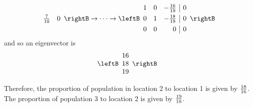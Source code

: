 \begin{solution}
\begin{equation*}
\begin{array}{rrr|r}
\frac{7}{10} &  0
\end{array}
\rightB
\rightarrow \cdots \rightarrow
\leftB
\begin{array}{rrr|r}
1 & 0 & -\vspace{.05in} \frac{16}{19} & 0 \\
0 & 1 & -\vspace{.05in} \frac{18}{19} & 0 \\
0 & 0 & 0 & 0
\end{array}
\rightB
\end{equation*}
and so an eigenvector is
\begin{equation*}
\leftB
\begin{array}{c}
16 \\
18 \\
19
\end{array}
\rightB 
\end{equation*}

Therefore, the proportion of population in location 2 to location 1 is given by $\vspace{.05in} \frac{18}{16}$.
The proportion of population 3 to location 2 is given by $\vspace{.05in} \frac{19}{18}$.
\end{solution}
